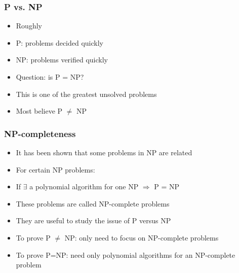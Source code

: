 
\begin{frame}[allowframebreaks] \frametitle{P vs. NP}
  \begin{itemize}
\item Roughly

\item [] P: problems decided quickly

\item [] NP: problems verified quickly
\item Question: is P = NP?

\item [] This is one of the greatest unsolved problems

\item Most believe P $\neq $ NP
\end{itemize}\end{frame} \begin{frame}[allowframebreaks] \frametitle{NP-completeness}
  \begin{itemize}
\item It has been shown that some problems in NP are related

\item For certain NP problems:

\item [] If $\exists$ a polynomial algorithm for one NP $\Rightarrow$ P = NP

\item These problems are called NP-complete problems
\item They are useful to study the issue of P versus NP
\item To prove P $\neq$ NP: only need to focus on
NP-complete problems
\item To prove P=NP: need only polynomial algorithms
for an NP-complete problem
\end{itemize}
\end{frame}

